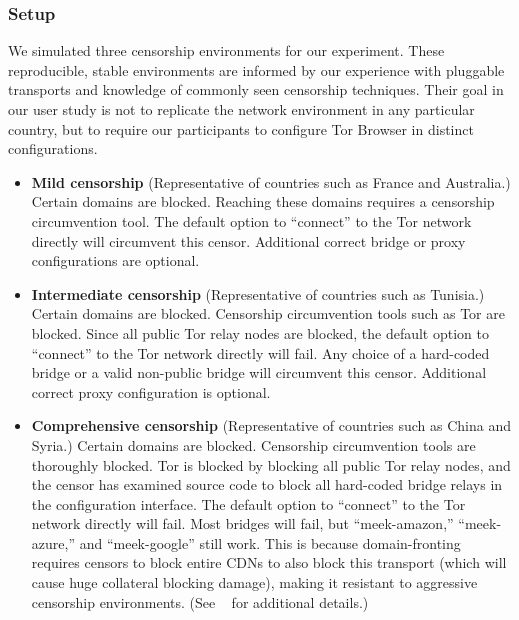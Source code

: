 \documentclass{template}
\begin{document}
\subsubsection{Setup}
\label{sec:setup}
We simulated three censorship environments for our experiment.
These reproducible, stable environments are informed by our experience 
with pluggable transports and knowledge of commonly seen censorship 
techniques. Their goal in our user study is not to replicate the network 
environment in any particular country, but to require our participants to 
configure Tor Browser in distinct configurations. 

\begin{itemize} \itemsep1pt \parskip0pt 
\item {\bfseries Mild censorship} 
(Representative of countries such as France and Australia.)
Certain domains are blocked. Reaching these 
domains requires a censorship circumvention 
tool. The default option to ``connect'' to the Tor network 
directly will circumvent this censor. Additional correct
bridge or proxy configurations are optional. 

\item {\bfseries Intermediate censorship} 
(Representative of countries such as Tunisia.)
Certain domains are blocked. Censorship circumvention
tools such as Tor are blocked. Since all public Tor
relay nodes are blocked, the default option to ``connect'' to the Tor network
directly will fail. Any choice of a hard-coded bridge
or a valid non-public bridge will circumvent this censor.  
Additional correct proxy configuration is optional.

\item {\bfseries Comprehensive censorship} 
(Representative of countries such as China and Syria.)
Certain domains are blocked. Censorship circumvention tools
are thoroughly blocked. Tor is blocked by blocking all public
Tor relay nodes, and the censor has examined source code to block
all hard-coded bridge relays in the configuration interface. The default option
to ``connect'' to the Tor network directly will fail. Most bridges will fail,
but ``meek-amazon,'' ``meek-azure,'' and ``meek-google'' still work.
This is because domain-fronting requires censors to block entire CDNs to also
block this transport (which will cause huge collateral blocking damage), making
it resistant to aggressive censorship environments.
(See ~\cite{fifield2015blocking} for additional details.)\\
\end{itemize}
\end{document}
